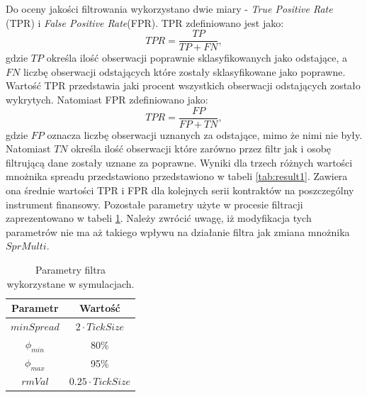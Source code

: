 \documentclass[a4paper,12pt,openany, DIV=calc, headsepline]{scrbook}
\begin{document}
Do oceny jakości filtrowania wykorzystano dwie miary - \emph{True Positive  Rate} (TPR) i \emph{False Positive Rate}(FPR). TPR zdefiniowano jest jako:
\begin{equation}
TPR = \frac{TP}{TP + FN},
\end{equation}
gdzie $TP$ określa ilość obserwacji poprawnie sklasyfikowanych jako odstające, a $FN$ liczbę obserwacji odstających które zostały sklasyfikowane jako poprawne. Wartość TPR przedstawia jaki procent wszystkich obserwacji odstających zostało wykrytych. Natomiast FPR zdefiniowano jako:
\begin{equation}
TPR = \frac{FP}{FP + TN},
\end{equation}
gdzie $FP$ oznacza liczbę obserwacji uznanych za odstające, mimo że nimi nie były. Natomiast $TN$ określa ilość obserwacji które zarówno przez filtr jak i osobę filtrującą dane zostały uznane za poprawne. Wyniki dla trzech różnych wartości mnożnika spreadu przedstawiono przedstawiono w tabeli \ref{tab:result1}. Zawiera ona średnie wartości TPR i FPR dla kolejnych serii kontraktów na poszczególny instrument finansowy. Pozostałe parametry użyte w procesie filtracji zaprezentowano w tabeli \ref{tab:params}. Należy zwrócić uwagę, iż modyfikacja tych parametrów nie ma aż takiego wpływu na działanie filtra jak zmiana mnożnika $SprMulti$.

\begin{table}
\centering
\begin{tabular}{|c|c|}
\hline
Parametr & Wartość \\
\hline
$minSpread$ & $2 \cdot TickSize$ \\
$\phi_{min}$ & 80\% \\
$\phi_{max}$ & 95\% \\
$rmVal$ & $0.25 \cdot TickSize$\\
\hline
\end{tabular}
\label{tab:params}
\caption{Parametry filtra wykorzystane w symulacjach.}
\end{table}
\end{document}
